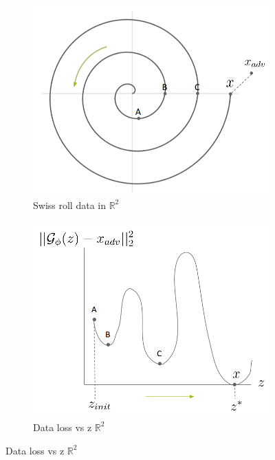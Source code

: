 \documentclass{article}
\theoremstyle{definition}
\begin{document}
\begin{figure}[H]
\begin{subfigure}{0.5\textwidth}
    \centering
    \includegraphics[scale=0.25]{./swiss.png}
    \caption{Swiss roll data in $\mathbb{R}^2$}

\end{subfigure}%
\begin{subfigure}{0.5\textwidth}  %
    \centering
    \includegraphics[scale=0.25]{./loss_swiss.png}
    \caption{Data loss vs z $\mathbb{R}^2$}
\end{subfigure}
\end{figure}
\end{document}

